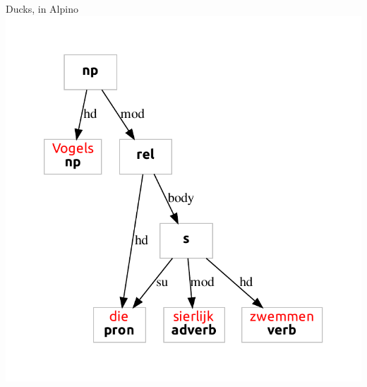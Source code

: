 \documentclass{beamer}
\begin{document}
{
\begin{frame}{Ducks, in Alpino}
\includegraphics[width=\textwidth,height=\textheight,keepaspectratio]{quackers.pdf}\end{frame}
}
\end{document}
